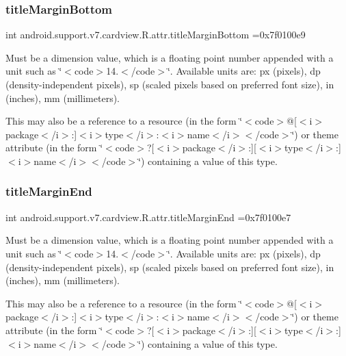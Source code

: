 \subsubsection{\texorpdfstring{title\+Margin\+Bottom}{titleMarginBottom}}
{\footnotesize\ttfamily int android.\+support.\+v7.\+cardview.\+R.\+attr.\+title\+Margin\+Bottom =0x7f0100e9\hspace{0.3cm}{\ttfamily [static]}}

Must be a dimension value, which is a floating point number appended with a unit such as \char`\"{}$<$code$>$14.\+5sp$<$/code$>$\char`\"{}. Available units are\+: px (pixels), dp (density-\/independent pixels), sp (scaled pixels based on preferred font size), in (inches), mm (millimeters). 

This may also be a reference to a resource (in the form \char`\"{}$<$code$>$@\mbox{[}$<$i$>$package$<$/i$>$\+:\mbox{]}$<$i$>$type$<$/i$>$\+:$<$i$>$name$<$/i$>$$<$/code$>$\char`\"{}) or theme attribute (in the form \char`\"{}$<$code$>$?\mbox{[}$<$i$>$package$<$/i$>$\+:\mbox{]}\mbox{[}$<$i$>$type$<$/i$>$\+:\mbox{]}$<$i$>$name$<$/i$>$$<$/code$>$\char`\"{}) containing a value of this type. \mbox{\label{classandroid_1_1support_1_1v7_1_1cardview_1_1R_1_1attr_ad40d5056e5b59a08e333810b3d2c4ee0}} 
\subsubsection{\texorpdfstring{title\+Margin\+End}{titleMarginEnd}}
{\footnotesize\ttfamily int android.\+support.\+v7.\+cardview.\+R.\+attr.\+title\+Margin\+End =0x7f0100e7\hspace{0.3cm}{\ttfamily [static]}}

Must be a dimension value, which is a floating point number appended with a unit such as \char`\"{}$<$code$>$14.\+5sp$<$/code$>$\char`\"{}. Available units are\+: px (pixels), dp (density-\/independent pixels), sp (scaled pixels based on preferred font size), in (inches), mm (millimeters). 

This may also be a reference to a resource (in the form \char`\"{}$<$code$>$@\mbox{[}$<$i$>$package$<$/i$>$\+:\mbox{]}$<$i$>$type$<$/i$>$\+:$<$i$>$name$<$/i$>$$<$/code$>$\char`\"{}) or theme attribute (in the form \char`\"{}$<$code$>$?\mbox{[}$<$i$>$package$<$/i$>$\+:\mbox{]}\mbox{[}$<$i$>$type$<$/i$>$\+:\mbox{]}$<$i$>$name$<$/i$>$$<$/code$>$\char`\"{}) containing a value of this type. \mbox{\label{classandroid_1_1support_1_1v7_1_1cardview_1_1R_1_1attr_a56eb14b3fe1237fddcc2b1837677a229}} 

